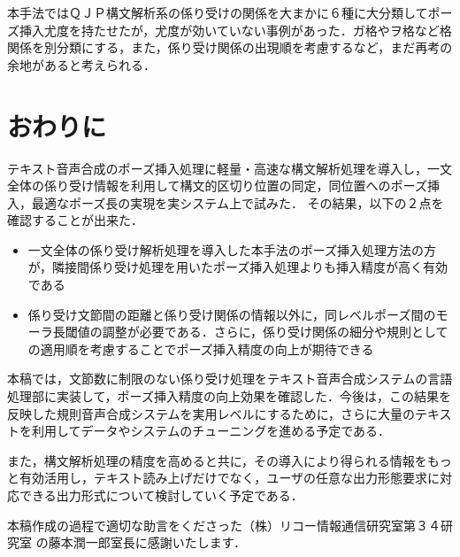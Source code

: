 本手法ではＱＪＰ構文解析系の係り受けの関係を大まかに６種に大分類してポーズ挿入尤度を持たせたが，尤度が効いていない事例があった．ガ格やヲ格など格関係を別分類にする，また，係り受け関係の出現順を考慮するなど，まだ再考の余地があると考えられる．

\section{おわりに}\label{sec:musubi}

テキスト音声合成のポーズ挿入処理に軽量・高速な構文解析処理を導入し，一文全体の係り受け情報を利用して構文的区切り位置の同定，同位置へのポーズ挿入，最適なポーズ長の実現を実システム上で試みた．
その結果，以下の２点を確認することが出来た．

\begin{itemize}

	\item 一文全体の係り受け解析処理を導入した本手法のポーズ挿入処理方法の方が，隣接間係り受け処理を用いたポーズ挿入処理よりも挿入精度が高く有効である

	\item 係り受け文節間の距離と係り受け関係の情報以外に，同レベルポーズ間のモーラ長閾値の調整が必要である．さらに，係り受け関係の細分や規則としての適用順を考慮することでポーズ挿入精度の向上が期待できる

\end{itemize}

本稿では，文節数に制限のない係り受け処理をテキスト音声合成システムの言語処理部に実装して，ポーズ挿入精度の向上効果を確認した．今後は，この結果を反映した規則音声合成システムを実用レベルにするために，さらに大量のテキストを利用してデータやシステムのチューニングを進める予定である．

また，構文解析処理の精度を高めると共に，その導入により得られる情報をもっと有効活用し，テキスト読み上げだけでなく，ユーザの任意な出力形態要求に対応できる出力形式について検討していく予定である．

\vspace{1.5cm}

\acknowledgment

本稿作成の過程で適切な助言をくださった（株）リコー情報通信研究室第３４研究室
の藤本潤一郎室長に感謝いたします．





